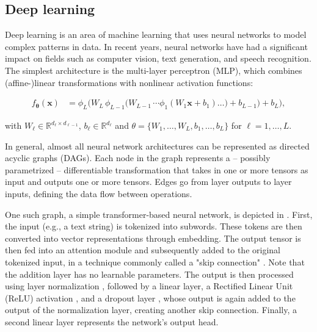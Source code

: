 \documentclass[article]{jss}
\theoremstyle{definition}
\begin{document}
\subsection{Deep learning}\label{sec:background_dl}

Deep learning is an area of machine learning that uses neural networks to model complex patterns in data.
In recent years, neural networks have had a significant impact on fields such as computer vision, text generation, and speech recognition.
The simplest architecture is the multi-layer perceptron (MLP), which combines (affine-)linear transformations with nonlinear activation functions:

\begin{align}
f_{\boldsymbol{\theta}}(\mathbf{x}) &=
  \phi_{L}\!\bigl(
    W_{L}\,\phi_{L-1}\!\bigl(
      W_{L-1}\,\dotsm\phi_{1}(W_{1}\mathbf{x}+b_{1}) \ldots )+ b_{L - 1}
    \bigr)+b_{L}
  \bigr),
\end{align}

\noindent
with \(W_{\ell}\in\mathbb{R}^{d_{\ell}\times d_{\ell-1}}\), \(b_{\ell}\in\mathbb{R}^{d_{\ell}}\) and \(\theta = \{W_1, \ldots, W_L, b_1, \ldots, b_L\}\) for \(\ell=1,\dots,L\).

In general, almost all neural network architectures can be represented as directed acyclic graphs (DAGs).
Each node in the graph represents a -- possibly parametrized -- differentiable transformation that takes in one or more tensors as input and outputs one or more tensors.
Edges go from layer outputs to layer inputs, defining the data flow between operations.

One such graph, a simple transformer-based neural network, is depicted in .
First, the input (e.g., a text string) is tokenized into subwords. These tokens are then converted into vector representations through embedding.
The output tensor is then fed into an attention module \citep{vaswani2017attention} and subsequently added to the original tokenized input, in a technique commonly called a "skip connection" \citep{he2016deep}.
Note that the addition layer has no learnable parameters.
The output is then processed using layer normalization \citep{ba2016layernormalization}, followed by a linear layer, a Rectified Linear Unit (ReLU) activation \citep{glorot2011deep}, and a dropout layer \citep{srivastava2014dropout}, whose output is again added to the output of the normalization layer, creating another skip connection.
Finally, a second linear layer represents the network's output head.
\end{document}
